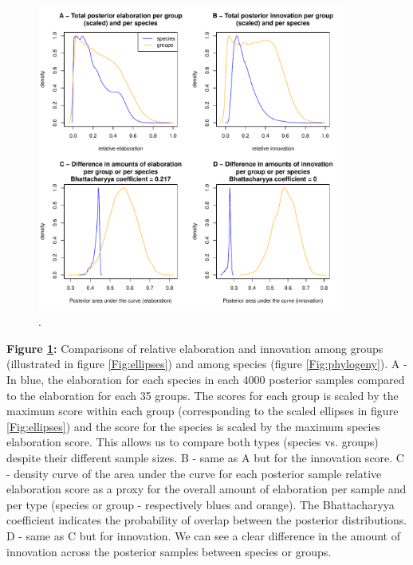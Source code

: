 \documentclass[12pt,letterpaper]{article}
\begin{document}
\begin{figure}[!htbp]
\centering
   \includegraphics[width=0.9\textwidth]{Figures/relative_EI.pdf}
\caption{.}
\label{Fig:relative_EI}
\end{figure}

\noindent \textbf{Figure \ref{Fig:relative_EI}:} Comparisons of relative elaboration and innovation among groups (illustrated in figure  \ref{Fig:ellipses}) and among species (figure \ref{Fig:phylogeny}).
A - In blue, the elaboration for each species in each 4000 posterior samples compared to the elaboration for each 35 groups.
The scores for each group is scaled by the maximum score within each group (corresponding to the scaled ellipses in figure  \ref{Fig:ellipses}) and the score for the species is scaled by the maximum species elaboration score.
This allows us to compare both types (species vs.
groups) despite their different sample sizes.
B - same as A but for the innovation score.
C - density curve of the area under the curve for each posterior sample relative elaboration score as a proxy for the overall amount of elaboration per sample and per type (species or group - respectively blues and orange).
The Bhattacharyya coefficient indicates the probability of overlap between the posterior distributions.
D - same as C but for innovation.
We can see a clear difference in the amount of innovation across the posterior samples between species or groups.
\end{document}
